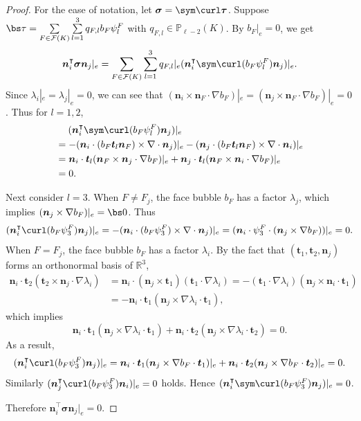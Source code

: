 \begin{proof}
For the ease of notation, let $\boldsymbol \sigma=\sym\curl\boldsymbol \tau$. Suppose $\bs\tau=\sum\limits_{F\in\mathcal F(K)}\sum\limits_{l=1}^3q_{F,l} b_F \psi_l^F$ with $q_{F,l}\in \mathbb P_{\ell-2}(K)$.
By $b_F|_e=0$, we get
$$
\boldsymbol n_i^{\intercal}\boldsymbol \sigma\boldsymbol n_j|_e=\sum_{F\in\mathcal F(K)}\sum_{l=1}^3q_{F,l}|_e(\boldsymbol n_i^{\intercal} \sym\curl(b_F \psi_l^F)\boldsymbol n_j)|_e.
$$
Since $\lambda_i|_e=\lambda_j|_e=0$, we can see that $(\boldsymbol n_i\times\boldsymbol n_F\cdot\nabla b_F)|_e=(\boldsymbol n_j\times\boldsymbol n_F\cdot\nabla b_F)|_e=0$. Thus for $l=1,2$,
\begin{align*}
&\quad\;(\boldsymbol n_i^{\intercal} \sym\curl(b_F \psi_l^F)\boldsymbol n_j)|_e\\
&=-(\boldsymbol n_i\cdot(b_F \boldsymbol t_l\boldsymbol n_F)\times\nabla\cdot\boldsymbol n_j)|_e - (\boldsymbol n_j\cdot(b_F\boldsymbol t_l\boldsymbol n_F)\times\nabla\cdot\boldsymbol n_i)|_e \\
&=\boldsymbol n_i\cdot\boldsymbol t_l(\boldsymbol n_F\times\boldsymbol n_j\cdot\nabla b_F)|_e + \boldsymbol n_j\cdot\boldsymbol t_l(\boldsymbol n_F\times\boldsymbol n_i\cdot\nabla b_F)|_e\\
&=0.
\end{align*}

Next consider $l=3$. When $F\neq F_j$, the face bubble $b_F$ has a factor $\lambda_j$, which implies $(\boldsymbol n_j\times\nabla b_F)|_e=\bs0$. Thus
$$
(\boldsymbol n_i^{\intercal}\curl(b_F \psi_3^F)\boldsymbol n_j)|_e =-(\boldsymbol n_i\cdot(b_F \psi_3^F)\times\nabla\cdot\boldsymbol n_j)|_e=(\boldsymbol n_i\cdot\psi_3^F\cdot(\boldsymbol n_j\times\nabla b_F))|_e=0.
$$
When $F= F_j$, the face bubble $b_F$ has a factor $\lambda_i$. 
By the fact that $(\boldsymbol t_1, \boldsymbol t_2, \boldsymbol n_j)$ forms an orthonormal basis of $\mathbb R^3$,
\begin{align*}
\boldsymbol n_i\cdot\boldsymbol t_2(\boldsymbol t_2\times\boldsymbol n_j\cdot\nabla\lambda_i)&=\boldsymbol n_i\cdot(\boldsymbol n_j\times\boldsymbol t_1)(\boldsymbol t_1\cdot\nabla\lambda_i)=-(\boldsymbol t_1\cdot\nabla\lambda_i)(\boldsymbol n_j\times\boldsymbol n_i\cdot\boldsymbol t_1) \\
&=-\boldsymbol n_i\cdot\boldsymbol t_1(\boldsymbol n_j\times\nabla\lambda_i\cdot\boldsymbol t_1),
\end{align*}
which implies
$$
\boldsymbol n_i\cdot\boldsymbol t_1(\boldsymbol n_j\times\nabla\lambda_i\cdot\boldsymbol t_1) + \boldsymbol n_i\cdot\boldsymbol t_2(\boldsymbol n_j\times\nabla\lambda_i\cdot\boldsymbol t_2)=0.
$$
As a result,
$$
(\boldsymbol n_i^{\intercal}\curl(b_F \psi_3^F)\boldsymbol n_j)|_e = \boldsymbol n_i\cdot\boldsymbol t_1(\boldsymbol n_j\times\nabla b_F\cdot\boldsymbol t_1)|_e + \boldsymbol n_i\cdot\boldsymbol t_2(\boldsymbol n_j\times\nabla b_F\cdot\boldsymbol t_2)|_e=0.
$$
Similarly $(\boldsymbol n_j^{\intercal}\curl(b_F \psi_3^F)\boldsymbol n_i)|_e=0$ holds. Hence $(\boldsymbol n_i^{\intercal}\sym\curl(b_F \psi_3^F)\boldsymbol n_j)|_e=0$.

Therefore $\boldsymbol  n_i^{\intercal}\boldsymbol \sigma\boldsymbol n_j|_e=0$.
\end{proof}

